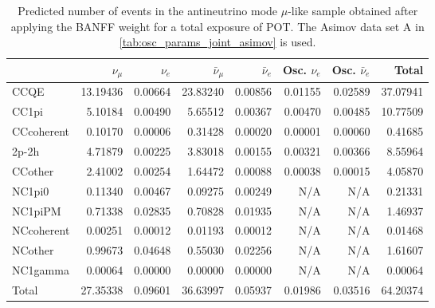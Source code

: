 
\begin{table}
\center
\begin{tabular} { | l ||r | r | r | r | r | r | | r | }
\hline
              & $\nu_\mu$            & $\nu_e$              & $\bar{\nu}_{\mu}$    & $\bar{\nu}_{e}$      & Osc. $\nu_e$         & Osc. $\bar{\nu}_{e}$ & Total                \\ \hline\hline
 CCQE         & 13.19436             & 0.00664              & 23.83240             & 0.00856              & 0.01155              & 0.02589              & 37.07941             \\ \hline
 CC1pi        & 5.10184              & 0.00490              & 5.65512              & 0.00367              & 0.00470              & 0.00485              & 10.77509             \\ \hline
 CCcoherent   & 0.10170              & 0.00006              & 0.31428              & 0.00020              & 0.00001              & 0.00060              & 0.41685              \\ \hline
 2p-2h        & 4.71879              & 0.00225              & 3.83018              & 0.00155              & 0.00321              & 0.00366              & 8.55964              \\ \hline
 CCother      & 2.41002              & 0.00254              & 1.64472              & 0.00088              & 0.00038              & 0.00015              & 4.05870              \\ \hline
 NC1pi0       & 0.11340              & 0.00467              & 0.09275              & 0.00249              & N/A                  & N/A                  & 0.21331              \\ \hline
 NC1piPM      & 0.71338              & 0.02835              & 0.70828              & 0.01935              & N/A                  & N/A                  & 1.46937              \\ \hline
 NCcoherent   & 0.00251              & 0.00012              & 0.01193              & 0.00012              & N/A                  & N/A                  & 0.01468              \\ \hline
 NCother      & 0.99673              & 0.04648              & 0.55030              & 0.02256              & N/A                  & N/A                  & 1.61607              \\ \hline
 NC1gamma     & 0.00064              & 0.00000              & 0.00000              & 0.00000              & N/A                  & N/A                  & 0.00064              \\ \hline
\hline
 Total        & 27.35338             & 0.09601              & 36.63997             & 0.05937              & 0.01986              & 0.03516              & 64.20374             \\ \hline

\end{tabular}
\caption{
Predicted number of events in the antineutrino mode $\mu$-like sample
obtained after applying the BANFF weight
for a total exposure of \TotalPotNuBarRunOneSevenC{} POT.
The Asimov data set A in \cref{tab:osc_params_joint_asimov} is used.
}
\label{tab:events_rhc1rmu_Asimov_A}
\end{table}


